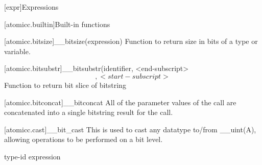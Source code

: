 [expr]{Expressions}


[atomicc.builtin]{Built-in functions}

[atomicc.bitsize]{__bitsize(expression)}
Function to return size in bits of a type or variable.

[atomicc.bitsubstr]{__bitsubstr(identifier, <end-subscript> \[, <start-subscript> \]}
Function to return bit slice of bitstring

[atomicc.bitconcat]{__bitconcat}
All of the parameter values of the call are concatenated into a single bitstring result for the call.

[atomicc.cast]{__bit_cast}
This is used to cast any datatype to/from __uint(A), allowing operations to be performed on a bit level.

\begin{bnf}
\br
      type-id \terminal{> (} expression \terminal{)}
\end{bnf}
